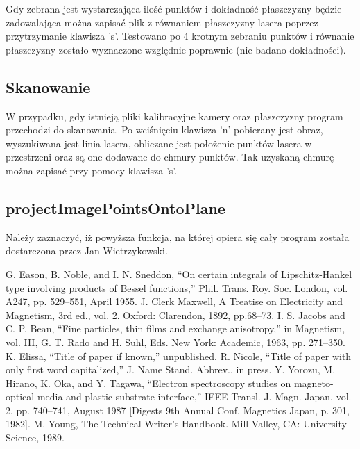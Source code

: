 \documentclass[conference]{IEEEtran}
\begin{document}
Gdy zebrana jest wystarczająca ilość punktów i dokładność płaszczyzny będzie zadowalająca można zapisać plik z równaniem płaszczyzny lasera poprzez przytrzymanie klawisza 's'.
Testowano po 4 krotnym zebraniu punktów i równanie płaszczyzny zostało wyznaczone względnie poprawnie (nie badano dokładności).

\subsection{Skanowanie}

W przypadku, gdy istnieją pliki kalibracyjne kamery oraz płaszczyzny program przechodzi do skanowania. Po wciśnięciu klawisza 'n' pobierany jest obraz, wyszukiwana jest linia lasera, obliczane jest położenie punktów lasera w przestrzeni oraz są one dodawane do chmury punktów. Tak uzyskaną chmurę można zapisać przy pomocy klawisza 's'.

\subsection{projectImagePointsOntoPlane}

Należy zaznaczyć, iż powyższa funkcja, na której opiera się cały program została dostarczona przez Jan Wietrzykowski.

\begin{thebibliography}{00}
 G. Eason, B. Noble, and I. N. Sneddon, ``On certain integrals of Lipschitz-Hankel type involving products of Bessel functions,'' Phil. Trans. Roy. Soc. London, vol. A247, pp. 529--551, April 1955.
 J. Clerk Maxwell, A Treatise on Electricity and Magnetism, 3rd ed., vol. 2. Oxford: Clarendon, 1892, pp.68--73.
 I. S. Jacobs and C. P. Bean, ``Fine particles, thin films and exchange anisotropy,'' in Magnetism, vol. III, G. T. Rado and H. Suhl, Eds. New York: Academic, 1963, pp. 271--350.
 K. Elissa, ``Title of paper if known,'' unpublished.
 R. Nicole, ``Title of paper with only first word capitalized,'' J. Name Stand. Abbrev., in press.
 Y. Yorozu, M. Hirano, K. Oka, and Y. Tagawa, ``Electron spectroscopy studies on magneto-optical media and plastic substrate interface,'' IEEE Transl. J. Magn. Japan, vol. 2, pp. 740--741, August 1987 [Digests 9th Annual Conf. Magnetics Japan, p. 301, 1982].
 M. Young, The Technical Writer's Handbook. Mill Valley, CA: University Science, 1989.
\end{thebibliography}
\end{document}
